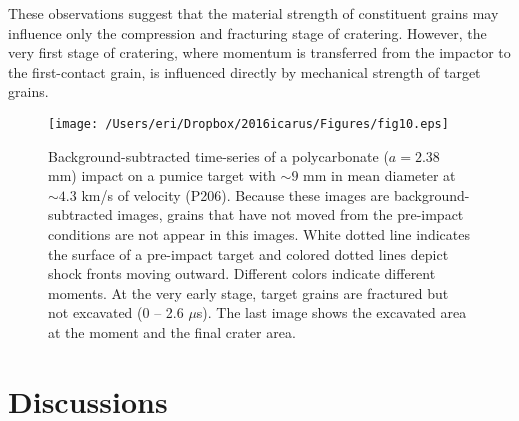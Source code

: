\documentclass[3p,authoryear]{elsarticle}
\begin{document}
These observations suggest that the material strength of constituent grains may influence only the compression and fracturing stage of cratering.
However, the very first stage of cratering, where momentum is transferred from the impactor to the first-contact grain, is influenced directly by mechanical strength of target grains.


\begin{figure*}[phtb]
	\centering
	\texttt{[image: /Users/eri/Dropbox/2016icarus/Figures/fig10.eps]}
	\caption{Background-subtracted time-series of a polycarbonate ($a=2.38$ mm) impact on a pumice target with $\sim 9$ mm in mean diameter at $\sim 4.3$ km/s of velocity (P206). Because these images are background-subtracted images, grains that have not moved from the pre-impact conditions are not appear in this images. White dotted line indicates the surface of a pre-impact target and colored dotted lines depict shock fronts moving outward. Different colors indicate different moments. At the very early stage, target grains are fractured but not excavated (0 -- 2.6 $\mu$s). The last image shows the excavated area at the moment and the final crater area.}
	\label{snapshots}
	\centering
\end{figure*}


%

\section{Discussions}

\end{document}
